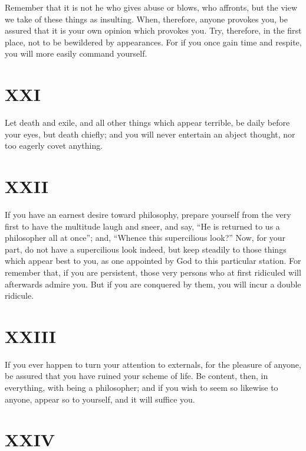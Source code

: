 \documentclass[11pt]{article}
\begin{document}
Remember that it is not he who gives abuse or blows, who affronts, but the view we take of these things as insulting. When, therefore, anyone provokes you, be assured that it is your own opinion which provokes you. Try, therefore, in the first place, not to be bewildered by appearances. For if you once gain time and respite, you will more easily command yourself.
\section*{XXI}

Let death and exile, and all other things which appear terrible, be daily before your eyes, but death chiefly; and you will never entertain an abject thought, nor too eagerly covet anything.
\section*{XXII}

If you have an earnest desire toward philosophy, prepare yourself from the very first to have the multitude laugh and sneer, and say, “He is returned to us a philosopher all at once”; and, “Whence this supercilious look?” Now, for your part, do not have a supercilious look indeed, but keep steadily to those things which appear best to you, as one appointed by God to this particular station. For remember that, if you are persistent, those very persons who at first ridiculed will afterwards admire you. But if you are conquered by them, you will incur a double ridicule.
\section*{XXIII}

If you ever happen to turn your attention to externals, for the pleasure of anyone, be assured that you have ruined your scheme of life. Be content, then, in everything, with being a philosopher; and if you wish to seem so likewise to anyone, appear so to yourself, and it will suffice you.
\section*{XXIV}
\end{document}
